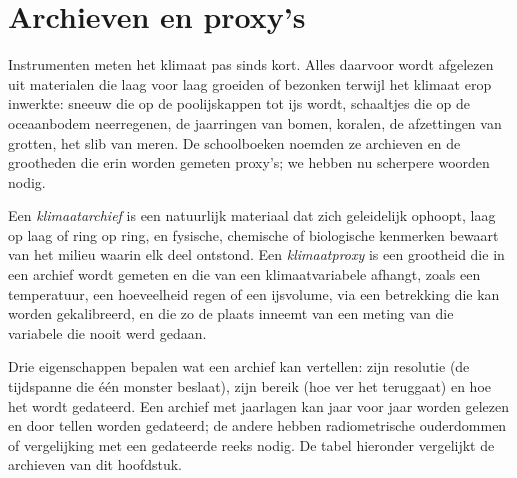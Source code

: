 \section{Archieven en proxy's}\label{sec:b2:climate-proxies:archives}

Instrumenten meten het klimaat pas sinds kort. Alles daarvoor wordt afgelezen uit materialen
die laag voor laag groeiden of bezonken terwijl het klimaat erop inwerkte: sneeuw die op de
poolijskappen tot ijs wordt, schaaltjes die op de oceaanbodem neerregenen, de jaarringen van bomen, koralen, de afzettingen van
grotten, het slib van meren. De schoolboeken noemden ze archieven en de grootheden die erin worden gemeten
proxy's; we hebben nu scherpere woorden nodig.

\begin{definition}\label{def:b2:climate-proxies:proxy}
Een \emph{klimaatarchief} is een natuurlijk materiaal dat zich
geleidelijk ophoopt, laag op laag of ring op ring, en fysische, chemische of biologische
kenmerken bewaart van het milieu waarin elk deel ontstond. Een
\emph{klimaatproxy} is een grootheid die in een archief wordt gemeten en die van een
klimaatvariabele afhangt, zoals een temperatuur, een hoeveelheid regen of een ijsvolume, via een betrekking die kan
worden gekalibreerd, en die zo de plaats inneemt van een meting van die variabele die nooit werd gedaan.
\end{definition}

Drie eigenschappen bepalen wat een archief kan vertellen: zijn resolutie (de tijdspanne die één
monster beslaat), zijn bereik (hoe ver het teruggaat) en hoe het wordt gedateerd. Een archief met jaarlagen kan
jaar voor jaar worden gelezen en door tellen worden gedateerd; de andere hebben radiometrische ouderdommen of vergelijking met een
gedateerde reeks nodig. De tabel hieronder vergelijkt de archieven van dit hoofdstuk.

